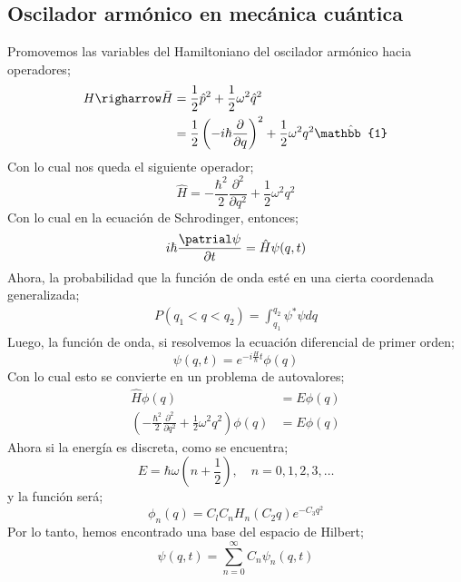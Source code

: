 \documentclass[../main.tex]{subfiles}
\begin{document}
\subsection{Oscilador armónico en mecánica cuántica}
Promovemos las variables del Hamiltoniano del oscilador armónico hacia operadores;
\begin{align*}
  H\righarrow \bar{H}& = \frac{1}{2}\hat{p}^2 + \frac{1}{2}\omega^2\hat{q}^2 \\
  & = \frac{1}{2}\left(-i\hbar \frac{\partial}{\partial q} \right)^2  + \frac{1}{2}\omega^2 q^2\hat{\mathbb{1}}
\end{align*}
Con lo cual nos queda el siguiente operador;
\begin{equation}
  \hat{H} = -\frac{\hbar^2}{2}\frac{\partial^2}{\partial q^2} + \frac{1}{2}\omega^2q^2
 \end{equation}
 Con lo cual en la ecuación de Schrodinger, entonces;
 \begin{equation}
   i\hbar \frac{\patrial \psi}{\partial t} = \hat{H} \psi(q,t)
  \end{equation}
  Ahora, la probabilidad que la función de onda esté en una cierta coordenada generalizada;
  \begin{align*}
    P(q_1<q<q_2) = \int_{q_1}^{q_2}\psi^*\psi dq
  \end{align*}
  Luego, la función de onda, si resolvemos la ecuación diferencial de primer orden;
  \begin{equation}
    \psi(q,t) = e^{-i\frac{H}{\hbar}t}\phi(q)
   \end{equation}
   Con lo cual esto se convierte en un problema de autovalores;
   \begin{align*}
     \hat{H}\phi(q) & = E\phi(q)   \\
     \left( -\frac{\hbar^2}{2}\frac{\partial^2}{\partial q^2} + \frac{1}{2}\omega^2 q^2 \right)\phi(q) & = E\phi(q)
   \end{align*}
   Ahora si la energía es discreta, como se encuentra;
   \begin{equation}
     E = \hbar \omega \left( n + \frac{1}{2} \right), \quad n=0,1,2,3,\dots
    \end{equation}
    y la función será;
    \begin{equation}
      \phi_n(q) = C_l C_n H_n(C_2 q) e^{-C_3 q^2}
     \end{equation}
  Por lo tanto, hemos encontrado una base del espacio de Hilbert;
  \begin{equation}
    \psi(q,t) = \sum_{n=0}^\infty C_n \psi_n(q,t)
   \end{equation}
\end{document}

